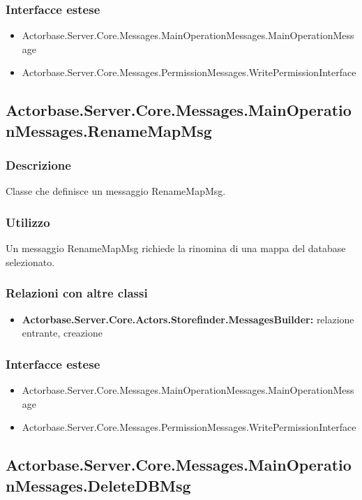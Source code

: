 \documentclass[a4paper]{article}
\begin{document}
			\subsubsection{Interfacce estese}
			\begin{itemize}
				\item Actorbase.Server.Core.Messages.MainOperationMessages.MainOperationMessage
				\item Actorbase.Server.Core.Messages.PermissionMessages.WritePermissionInterface
			\end{itemize}

			\subsection{Actorbase.Server.Core.Messages.MainOperationMessages.RenameMapMsg}
			\subsubsection{Descrizione}
				Classe che definisce un messaggio RenameMapMsg.
			\subsubsection{Utilizzo}
				Un messaggio RenameMapMsg richiede la rinomina di una mappa del database selezionato.
			\subsubsection{Relazioni con altre classi}
			\begin{itemize}
				\item \textbf{Actorbase.Server.Core.Actors.Storefinder.MessagesBuilder:} relazione entrante, creazione
			\end{itemize}
			\subsubsection{Interfacce estese}
			\begin{itemize}
				\item Actorbase.Server.Core.Messages.MainOperationMessages.MainOperationMessage
				\item Actorbase.Server.Core.Messages.PermissionMessages.WritePermissionInterface
			\end{itemize}

			\subsection{Actorbase.Server.Core.Messages.MainOperationMessages.DeleteDBMsg}
\end{document}
